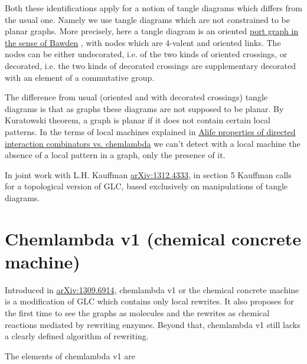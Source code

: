 \documentclass{article}
\begin{document}
\vspace{.5cm}

Both these identifications apply for a notion of tangle diagrams which differs from the usual one. Namely we use tangle diagrams which are not constrained to be planar graphs. 
More precisely, here a tangle diagram is an oriented \href{http://citeseerx.ist.psu.edu/viewdoc/download?doi=10.1.1.18.5446&rep=rep1&type=pdf}{port graph in the sense of Bawden} \cite{bawden1} \cite{bawden2}, with nodes which are 4-valent and oriented links. The nodes can be either undecorated, i.e. of the two kinds of oriented crossings, or decorated, i.e. the two kinds of decorated crossings are supplementary decorated with an element of a commutative group.


The difference from usual (oriented and with decorated crossings) tangle diagrams is that as graphs these diagrams are not supposed to be planar. By Kuratowski theorem, a graph is planar if it does not contain certain local patterns. In the terms of local machines explained in \cite{buligaalife} 
\href{https://mbuliga.github.io/quinegraphs/ic-vs-chem.html#icvschem}{Alife properties of directed interaction combinators vs. chemlambda} 
we can't detect with a local machine the absence of a local pattern in a graph, only the presence of it.


 In joint work with L.H. Kauffman  \cite{buligakauffmanglc} \href{https://arxiv.org/abs/1312.4333}{arXiv:1312.4333}, in section 5 Kauffman calls for a topological version of GLC, based exclusively on manipulations of tangle diagrams.












\section{Chemlambda v1 (chemical concrete machine)}
\label{ChemlambdaV1}
Introduced in \cite{buligachem} \href{https://arxiv.org/abs/1309.6914}{arXiv:1309.6914}, chemlambda v1 or the chemical concrete machine is a modification of GLC which contains only local rewrites. It also proposes for the first time to see the graphs as molecules and the rewrites as chemical reactions mediated by rewriting enzymes. Beyond that, chemlambda v1 still lacks a clearly defined algorithm of rewriting.


The elements of chemlambda v1 are
\end{document}
